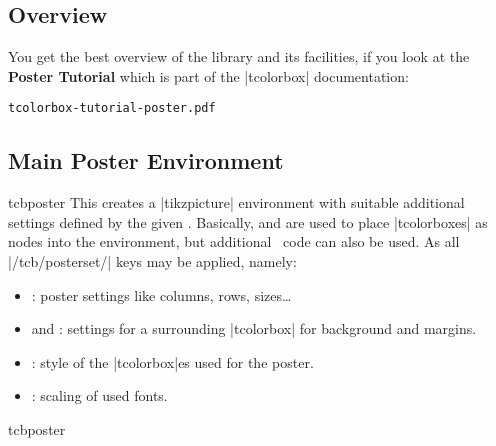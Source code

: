 \subsection{Overview}\label{subsec:poster_overview}


\begin{tcolorbox}[base example,hyperurl={tcolorbox-tutorial-poster.pdf},title=Click me to see the tutorial]
You get the best overview of the  library and its facilities,
if you look at the \textbf{Poster Tutorial} which is part of the |tcolorbox|
documentation:\par
\texttt{tcolorbox-tutorial-poster.pdf}
\end{tcolorbox}



\clearpage
\subsection{Main Poster Environment}\label{subsec:poster_environment}

\begin{docEnvironment}[doc new=2017-07-03]{tcbposter}{}
  This creates a |tikzpicture| environment with suitable additional
  settings defined by the given .
  Basically,  and  are
  used to place |tcolorboxes| as nodes into the environment,
  but additional \tikzname\ code can also be used.
  As  all |/tcb/posterset/| keys may be applied, namely:
\begin{itemize}
\item{}: poster settings like columns, rows, sizes\ldots
\item{} and :
  settings for a surrounding |tcolorbox| for background and margins.
\item{}: style of the |tcolorbox|es used for the poster.
\item{}: scaling of used fonts.
\end{itemize}

\begin{exdispExample}{tcbposter}
  \begin{tcbposter}[
    poster = {showframe,height=10cm,spacing=2mm},
    boxes  = {beamer,colframe=blue!50!black,colback=blue!50,colupper=yellow!50},
  ]
  \end{tcbposter}
\end{exdispExample}
\end{docEnvironment}

